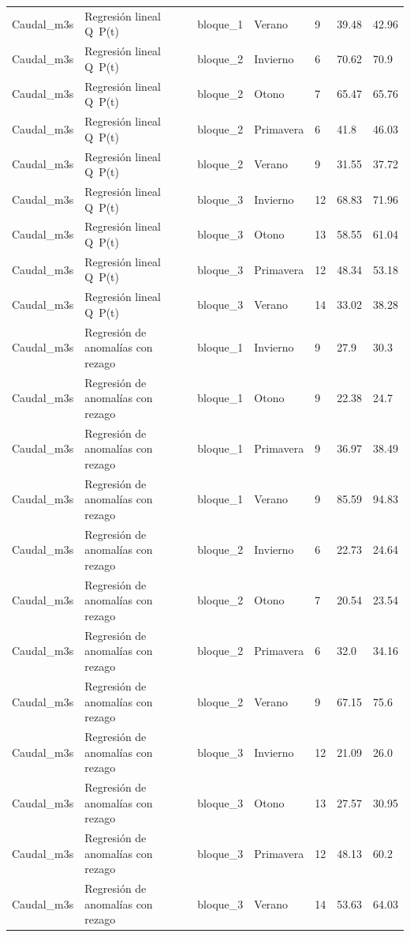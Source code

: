 \begin{longtable}{lllllll}
Caudal\_m3s & Regresión lineal Q~P(t) & bloque\_1 & Verano & 9 & 39.48 & 42.96 \\
Caudal\_m3s & Regresión lineal Q~P(t) & bloque\_2 & Invierno & 6 & 70.62 & 70.9 \\
Caudal\_m3s & Regresión lineal Q~P(t) & bloque\_2 & Otono & 7 & 65.47 & 65.76 \\
Caudal\_m3s & Regresión lineal Q~P(t) & bloque\_2 & Primavera & 6 & 41.8 & 46.03 \\
Caudal\_m3s & Regresión lineal Q~P(t) & bloque\_2 & Verano & 9 & 31.55 & 37.72 \\
Caudal\_m3s & Regresión lineal Q~P(t) & bloque\_3 & Invierno & 12 & 68.83 & 71.96 \\
Caudal\_m3s & Regresión lineal Q~P(t) & bloque\_3 & Otono & 13 & 58.55 & 61.04 \\
Caudal\_m3s & Regresión lineal Q~P(t) & bloque\_3 & Primavera & 12 & 48.34 & 53.18 \\
Caudal\_m3s & Regresión lineal Q~P(t) & bloque\_3 & Verano & 14 & 33.02 & 38.28 \\
Caudal\_m3s & Regresión de anomalías con rezago & bloque\_1 & Invierno & 9 & 27.9 & 30.3 \\
Caudal\_m3s & Regresión de anomalías con rezago & bloque\_1 & Otono & 9 & 22.38 & 24.7 \\
Caudal\_m3s & Regresión de anomalías con rezago & bloque\_1 & Primavera & 9 & 36.97 & 38.49 \\
Caudal\_m3s & Regresión de anomalías con rezago & bloque\_1 & Verano & 9 & 85.59 & 94.83 \\
Caudal\_m3s & Regresión de anomalías con rezago & bloque\_2 & Invierno & 6 & 22.73 & 24.64 \\
Caudal\_m3s & Regresión de anomalías con rezago & bloque\_2 & Otono & 7 & 20.54 & 23.54 \\
Caudal\_m3s & Regresión de anomalías con rezago & bloque\_2 & Primavera & 6 & 32.0 & 34.16 \\
Caudal\_m3s & Regresión de anomalías con rezago & bloque\_2 & Verano & 9 & 67.15 & 75.6 \\
Caudal\_m3s & Regresión de anomalías con rezago & bloque\_3 & Invierno & 12 & 21.09 & 26.0 \\
Caudal\_m3s & Regresión de anomalías con rezago & bloque\_3 & Otono & 13 & 27.57 & 30.95 \\
Caudal\_m3s & Regresión de anomalías con rezago & bloque\_3 & Primavera & 12 & 48.13 & 60.2 \\
Caudal\_m3s & Regresión de anomalías con rezago & bloque\_3 & Verano & 14 & 53.63 & 64.03 \\

\end{longtable}
